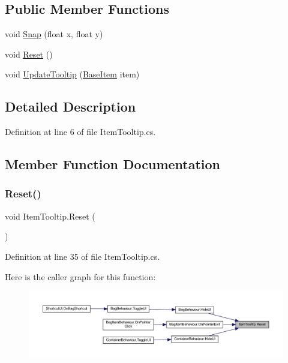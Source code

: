 \subsection*{Public Member Functions}
\begin{DoxyCompactItemize}
\item 
void \mbox{\hyperlink{class_item_tooltip_ae6eb8ab5acd326e431e46a3df5b76fa4}{Snap}} (float x, float y)
\item 
void \mbox{\hyperlink{class_item_tooltip_a4db0f30912c9b31ac912dbac40b17185}{Reset}} ()
\item 
void \mbox{\hyperlink{class_item_tooltip_a51e15cd0c208c14105cc8bedf452385b}{Update\+Tooltip}} (\mbox{\hyperlink{class_base_item}{Base\+Item}} item)
\end{DoxyCompactItemize}


\subsection{Detailed Description}


Definition at line 6 of file Item\+Tooltip.\+cs.



\subsection{Member Function Documentation}
\mbox{\label{class_item_tooltip_a4db0f30912c9b31ac912dbac40b17185}} 
\subsubsection{\texorpdfstring{Reset()}{Reset()}}
{\footnotesize\ttfamily void Item\+Tooltip.\+Reset (\begin{DoxyParamCaption}{ }\end{DoxyParamCaption})}



Definition at line 35 of file Item\+Tooltip.\+cs.

Here is the caller graph for this function\+:
\nopagebreak
\begin{figure}[H]
\begin{center}
\leavevmode
\includegraphics[width=350pt]{class_item_tooltip_a4db0f30912c9b31ac912dbac40b17185_icgraph}
\end{center}
\end{figure}
\mbox{\label{class_item_tooltip_ae6eb8ab5acd326e431e46a3df5b76fa4}} 
